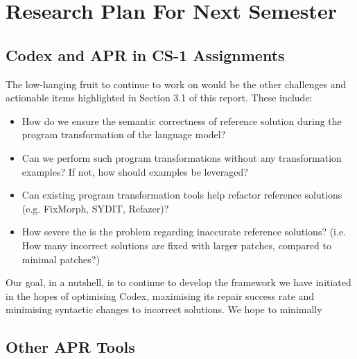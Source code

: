\chapter{Research Plan For Next Semester}

\section{Codex and APR in CS-1 Assignments}

The low-hanging fruit to continue to work on would be the other challenges and
actionable items highlighted in Section 3.1 of this report.
These include:
\begin{itemize}
    \item How do we ensure the semantic correctness of reference solution during the program
          transformation of the language model?
    \item Can we perform such program transformations without any transformation examples?
          If not, how should examples be leveraged?
    \item Can existing program transformation tools help refactor reference solutions
          (e.g. FixMorph, SYDIT, Refazer)?
    \item How severe the is the problem regarding inaccurate reference solutions?
          (i.e. How many incorrect solutions are fixed with larger patches, compared
           to minimal patches?)
\end{itemize}

Our goal, in a nutshell, is to continue to develop the framework we have initiated
in the hopes of optimising Codex, maximising its repair success rate and minimising
syntactic changes to incorrect solutions.
We hope to minimally

\section{Other APR Tools}